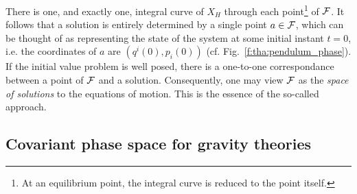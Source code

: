 There is one, and exactly one,
integral curve of $X_H$ through each point\footnote{At an equilibrium point, the
integral curve is reduced to the point itself.} of $\mathcal{F}$.
It follows that a solution is entirely determined by a single point $a\in\mathcal{F}$,
which can be thought of as representing the state of the system at some initial
instant $t=0$, i.e. the coordinates of $a$ are $(q^i(0),p_i(0))$
(cf. Fig.~\ref{f:tha:pendulum_phase}).
If the initial value problem is well posed, there is a one-to-one
correspondance between a point of $\mathcal{F}$ and a solution.
Consequently, one may view $\mathcal{F}$ as the \emph{space of solutions}
to the equations of motion. This is the essence of the
so-called  approach.


\subsection{Covariant phase space for gravity theories}


